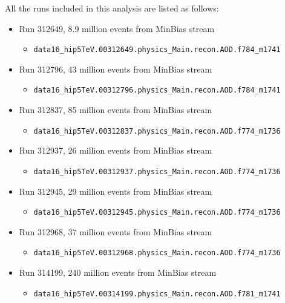 All the runs included in this analysis are listed as follows:
\begin{itemize}

\item Run 312649, 8.9 million events from MinBias stream
\begin{itemize}[leftmargin=*]
\item[] \verb|data16_hip5TeV.00312649.physics_Main.recon.AOD.f784_m1741|
\end{itemize}

\item Run 312796, 43 million events from MinBias stream
\begin{itemize}[leftmargin=*]
\item[] \verb|data16_hip5TeV.00312796.physics_Main.recon.AOD.f784_m1741|
\end{itemize}

\item Run 312837, 85 million events from MinBias stream
\begin{itemize}[leftmargin=*]
\item[] \verb|data16_hip5TeV.00312837.physics_Main.recon.AOD.f774_m1736|
\end{itemize}

\item Run 312937, 26 million events from MinBias stream
\begin{itemize}[leftmargin=*]
\item[] \verb|data16_hip5TeV.00312937.physics_Main.recon.AOD.f774_m1736|
\end{itemize}

\item Run 312945, 29 million events from MinBias stream
\begin{itemize}[leftmargin=*]
\item[] \verb|data16_hip5TeV.00312945.physics_Main.recon.AOD.f774_m1736|
\end{itemize}

\item Run 312968, 37 million events from MinBias stream
\begin{itemize}[leftmargin=*]
\item[] \verb|data16_hip5TeV.00312968.physics_Main.recon.AOD.f774_m1736|
\end{itemize}

\item Run 314199, 240 million events from MinBias stream
\begin{itemize}[leftmargin=*]
\item[] \verb|data16_hip5TeV.00314199.physics_Main.recon.AOD.f781_m1741|
\end{itemize}

\end{itemize}

